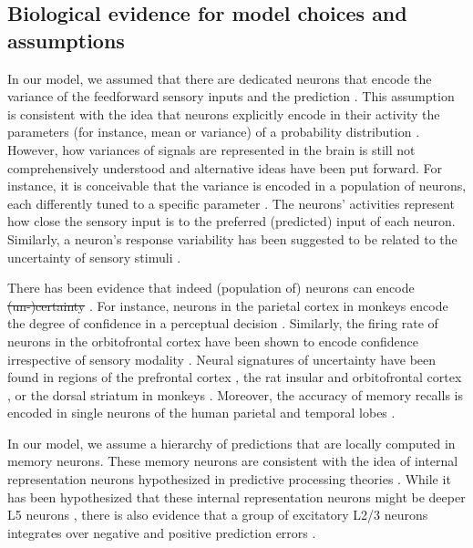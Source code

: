 \documentclass[10pt,a4paper]{article}
\providecommand{\DIFaddtex}[1]{{\protect\color{blue}\uwave{#1}}} %
\providecommand{\DIFdeltex}[1]{{\protect\color{red}\sout{#1}}}                      %
\providecommand{\DIFaddbegin}{} %
\providecommand{\DIFaddend}{} %
\providecommand{\DIFdelbegin}{} %
\providecommand{\DIFdelend}{} %
\providecommand{\DIFadd}[1]{\texorpdfstring{\DIFaddtex{#1}}{#1}} %
\providecommand{\DIFdel}[1]{\texorpdfstring{\DIFdeltex{#1}}{}} %
\newcommand{\DIFscaledelfig}{0.5}
\newlength{\DIFdelgraphicswidth} %
\newlength{\DIFdelgraphicsheight} %
\newcommand{\DIFaddincludegraphics}[2][]{{\color{blue}\fbox{\DIFOincludegraphics[#1]{#2}}}} %
\newcommand{\DIFdelincludegraphics}[2][]{%
\sbox{\DIFdelgraphicsbox}{\DIFOincludegraphics[#1]{#2}}%
\settoboxwidth{\DIFdelgraphicswidth}{\DIFdelgraphicsbox} %
\settoboxtotalheight{\DIFdelgraphicsheight}{\DIFdelgraphicsbox} %
\scalebox{\DIFscaledelfig}{%
\parbox[b]{\DIFdelgraphicswidth}{\usebox{\DIFdelgraphicsbox}\\[-\baselineskip] \rule{\DIFdelgraphicswidth}{0em}}\llap{\resizebox{\DIFdelgraphicswidth}{\DIFdelgraphicsheight}{%
\setlength{\unitlength}{\DIFdelgraphicswidth}%
\begin{picture}(1,1)%
\thicklines\linethickness{2pt} %
{\color[rgb]{1,0,0}\put(0,0){\framebox(1,1){}}}%
{\color[rgb]{1,0,0}\put(0,0){\line( 1,1){1}}}%
{\color[rgb]{1,0,0}\put(0,1){\line(1,-1){1}}}%
\end{picture}%
}\hspace*{3pt}}} %
} %
\DeclareRobustCommand{\DIFaddbegin}{\DIFOaddbegin \let\includegraphics\DIFaddincludegraphics} %
\DeclareRobustCommand{\DIFaddend}{\DIFOaddend \let\includegraphics\DIFOincludegraphics} %
\DeclareRobustCommand{\DIFdelbegin}{\DIFOdelbegin \let\includegraphics\DIFdelincludegraphics} %
\DeclareRobustCommand{\DIFdelend}{\DIFOaddend \let\includegraphics\DIFOincludegraphics} %
\begin{document}
\subsection*{Biological evidence for model choices and assumptions}
%
In our model, we assumed that there are dedicated neurons that encode the variance of the feedforward sensory inputs and the prediction \DIFaddbegin \DIFadd{\mbox{%
\citep[see also][]{wilmes2023uncertainty}}\hskip0pt%
}\DIFaddend . This assumption is consistent with the idea that neurons explicitly encode in their activity the parameters (for instance, mean or variance) of a probability distribution \citep{o2010coding, o2012can}. However, how variances of signals are represented in the brain is still not comprehensively understood and alternative ideas have been put forward. For instance, it is conceivable that the variance is encoded in a population of neurons, each differently tuned to a specific parameter \citep{knill2004bayesian}. The neurons' activities represent how close the sensory input is to the preferred (predicted) input of each neuron. Similarly, a neuron's response variability has been suggested to be related to the uncertainty of sensory stimuli \citep{hoyer2002interpreting, ma2006bayesian}.

There has been evidence that indeed (population of) neurons can encode \DIFdelbegin \DIFdel{(un-)certainty }\DIFdelend \DIFaddbegin \DIFadd{uncertainty }\DIFaddend \citep{soltani2019adaptive}. For instance, neurons in the parietal cortex in monkeys encode the degree of confidence in a perceptual decision \citep{kiani2009representation}. Similarly, the firing rate of neurons in the orbitofrontal cortex have been shown to encode confidence irrespective of sensory modality \citep{masset2020behavior}. Neural signatures of uncertainty have been found in regions of the prefrontal cortex \citep{rushworth2008choice}, the rat insular and orbitofrontal cortex \citep{jo2016differential}, or the dorsal striatum in monkeys \citep{white2016neurons}. Moreover, the accuracy of memory recalls is encoded in single neurons of the human parietal and temporal lobes \cite{rutishauser2015representation, rutishauser2018single}.

In our model, we assume a hierarchy of predictions that are locally computed in memory neurons. These memory neurons are consistent with the idea of internal representation neurons hypothesized in predictive processing theories \citep{bastos2012canonical, keller2018predictive}. While it has been hypothesized that these internal representation neurons might be deeper L5 neurons \citep{bastos2012canonical, heindorf2022reduction}, there is also evidence that a group of excitatory L2/3 neurons integrates over negative and positive prediction errors \citep{o2022prediction}.
\end{document}
